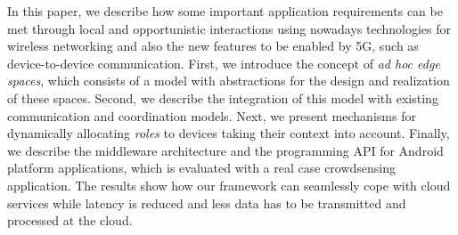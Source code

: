 In this paper, we describe how some important application requirements can be met through local and opportunistic interactions using nowadays technologies for wireless networking and also the new features to be enabled by 5G, such as device-to-device communication. First, we introduce the concept of \textit{ad hoc edge spaces}, which consists of a model with abstractions for the design and realization of these spaces. Second, we describe the integration of this model with existing communication and coordination models. Next, we present mechanisms for dynamically allocating \textit{roles} to devices taking their context into account. Finally, we describe the middleware architecture and the programming API for Android platform applications, which is evaluated with a real case crowdsensing application. The results show how our framework can seamlessly cope with cloud services while latency is reduced and less data has to be transmitted and processed at the cloud.



